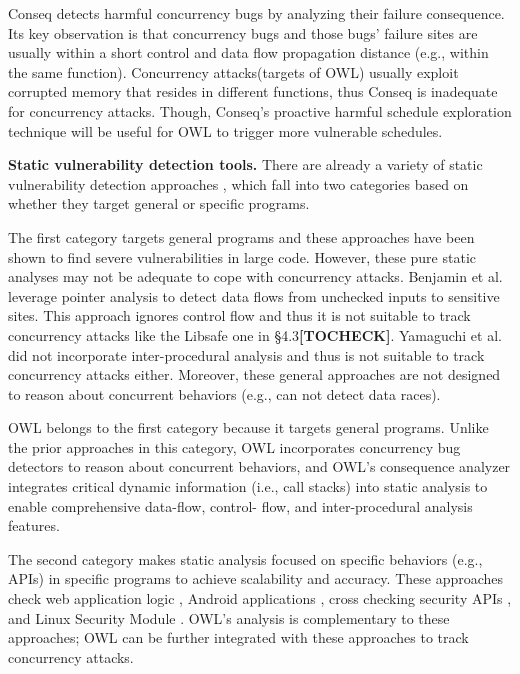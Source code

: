 Conseq \cite{conseq:asplos11} detects harmful concurrency bugs by analyzing
their failure consequence. Its key observation is that concurrency
bugs and those bugs' failure sites are usually within a
short control and data flow propagation distance (e.g., within
the same function). Concurrency attacks(targets of OWL)
usually exploit corrupted memory that resides in different
functions, thus Conseq is inadequate for concurrency attacks.
Though, Conseq’s proactive harmful schedule exploration technique
will be useful for OWL to trigger more vulnerable schedules.

\noindent
\textbf{Static vulnerability detection tools.} There are already a variety
of static vulnerability detection approaches \cite{livshits05finding,yamaguchi2014modeling,felmetsger2010toward,felmetsger2010toward,srivastava2011security,zhang:usenix:sec02}, which fall into two categories based
on whether they target general or specific programs.

The first category \cite{livshits05finding,yamaguchi2014modeling} targets general programs and
these approaches have been shown to find severe vulnerabilities
in large code. However, these pure static analyses may
not be adequate to cope with concurrency attacks. Benjamin
et al. \cite{livshits05finding} leverage pointer analysis to detect data flows from
unchecked inputs to sensitive sites. This approach ignores
control flow and thus it is not suitable to track concurrency
attacks like the Libsafe one in §4.3\textbf{[TOCHECK]}. Yamaguchi et al. \cite{yamaguchi2014modeling}
did not incorporate inter-procedural analysis and thus is not
suitable to track concurrency attacks either. Moreover, these
general approaches are not designed to reason about concurrent
behaviors (e.g., \cite{yamaguchi2014modeling} can not detect data races).

OWL belongs to the first category because it targets general
programs. Unlike the prior approaches in this category,
OWL incorporates concurrency bug detectors to reason about
concurrent behaviors, and OWL’s consequence analyzer integrates
critical dynamic information (i.e., call stacks) into
static analysis to enable comprehensive data-flow, control-
flow, and inter-procedural analysis features.

The second category \cite{felmetsger2010toward,arzt2014flowdroid,srivastava2011security,zhang:usenix:sec02} makes static analysis
focused on specific behaviors (e.g., APIs) in specific programs
to achieve scalability and accuracy. These approaches check
web application logic \cite{felmetsger2010toward}, Android applications \cite{arzt2014flowdroid}, cross
checking security APIs \cite{srivastava2011security}, and Linux Security
Module \cite{zhang:usenix:sec02}. OWL’s analysis is complementary to these
approaches; OWL can be further integrated with these approaches
to track concurrency attacks.

